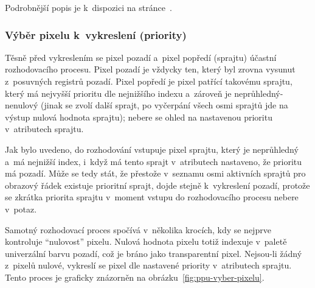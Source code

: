 Podrobnější popis je k~dispozici na stránce~\cite{Nesdev:ppu-sprites}.

\subsubsection{Výběr pixelu k~vykreslení (priority)}
\label{sec:ppu-priority}
Těsně před vykreslením se pixel pozadí a~pixel popředí (sprajtu) účastní rozhodovacího procesu. Pixel pozadí je vždycky ten, který byl zrovna vysunut z~posuvných registrů pozadí. Pixel popředí je pixel patřící takovému sprajtu, který má nejvyšší prioritu dle nejnižšího indexu a~zároveň je neprůhledný-nenulový (jinak se zvolí další sprajt, po vyčerpání všech osmi sprajtů jde na výstup nulová hodnota sprajtu); nebere se ohled na nastavenou prioritu v~atributech sprajtu.

\begin{note}
	Jak bylo uvedeno, do rozhodování vstupuje pixel sprajtu, který je neprůhledný a~má nejnižší index, i~když má tento sprajt v~atributech nastaveno, že prioritu má pozadí. Může se tedy stát, že přestože v~seznamu osmi aktivních sprajtů pro obrazový řádek existuje prioritní sprajt, dojde stejně k~vykreslení pozadí, protože se zkrátka priorita sprajtu v~moment vstupu do rozhodovacího procesu nebere v~potaz.
\end{note}

Samotný rozhodovací proces spočívá v~několika krocích, kdy se nejprve kontroluje \enquote{nulovost} pixelu. Nulová hodnota pixelu totiž indexuje v~paletě univerzální barvu pozadí, což je bráno jako transparentní pixel. Nejsou-li žádný z~pixelů nulové, vykreslí se pixel dle nastavené priority v~atributech sprajtu. Tento proces je graficky znázorněn na obrázku~\ref{fig:ppu-vyber-pixelu}.

